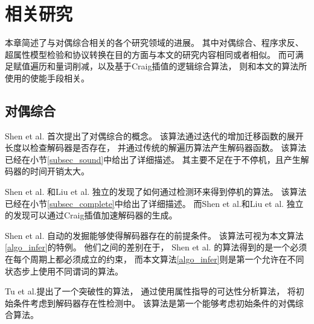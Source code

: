 \chapter{相关研究}
\label{chap:2}
%
%

本章简述了与对偶综合相关的各个研究领域的进展。
其中对偶综合、程序求反、超属性模型检验和协议转换在目的方面与本文的研究内容相同或者相似。
而可满足赋值遍历和量词削减，以及基于Craig插值的逻辑综合算法，
则和本文的算法所使用的使能手段相关。

\section{对偶综合}\label{subsec_compsyn_relat}
Shen et al. 首次提出了对偶综合的概念。
该算法通过迭代的增加迁移函数的展开长度以检查解码器是否存在，
并通过传统的解遍历算法产生解码器函数。
该算法已经在小节\ref{subsec_sound}中给出了详细描述。
其主要不足在于不停机，且产生解码器的时间开销太大。

Shen et al. 和Liu et al. 独立的发现了如何通过检测环来得到停机的算法。
该算法已经在小节\ref{subsec_complete}中给出了详细描述。
而Shen et al.和Liu et al. 独立的发现可以通过Craig插值加速解码器的生成。

Shen et al.  自动的发掘能够使得解码器存在的前提条件。
该算法可视为本文算法\ref{algo_infer}的特例。
他们之间的差别在于，
Shen et al. 的算法得到的是一个必须在每个周期上都必须成立的约束，
而本文算法\ref{algo_infer}则是第一个允许在不同状态步上使用不同谓词的算法。

Tu et al.提出了一个突破性的算法，
通过使用属性指导的可达性分析算法，
将初始条件考虑到解码器存在性检测中。
该算法是第一个能够考虑初始条件的对偶综合算法。

